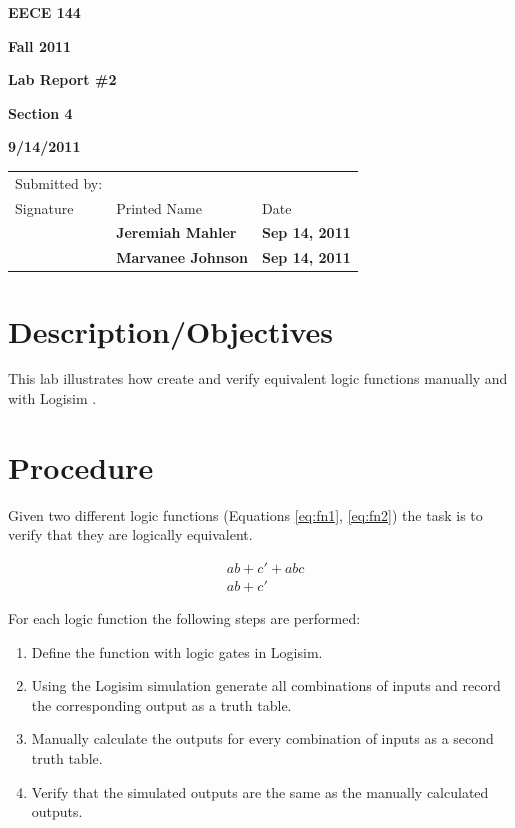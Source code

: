\documentclass[12pt]{article}
\begin{document}

\centerline{\bf EECE 144}
\centerline{\bf Fall 2011}
\centerline{\bf}
\centerline{\bf Lab Report \#2}
\centerline{\bf Section 4}
\centerline{\bf 9/14/2011}

\begin{center}
\begin{tabularx}{\textwidth}[b]{X l l}
Submitted by: & & \\
Signature & Printed Name & Date \\
\hline
\multicolumn{1}{|X|}{} & \multicolumn{1}{|l|}{\bigstrut \bf Jeremiah Mahler} & \multicolumn{1}{|l|}{\bf Sep 14, 2011} \\
\hline
\multicolumn{1}{|X|}{} & \multicolumn{1}{|l|}{\bigstrut \bf Marvanee Johnson} & \multicolumn{1}{|l|}{\bf Sep 14, 2011} \\
\hline
\end{tabularx}
\end{center}

\section{Description/Objectives}

This lab illustrates how create and verify equivalent logic functions
manually and with Logisim \cite{LOGISIM}.

\section{Procedure}

Given two different logic functions (Equations \ref{eq:fn1}, \ref{eq:fn2})
the task is to verify that they are logically equivalent.

\begin{align}
& a b + c' + abc \label{eq:fn1} \\
& a b + c' \label{eq:fn2}
\end{align}

For each logic function the following steps are performed:
\begin{enumerate}
	\item Define the function with logic gates in Logisim.
	\item Using the Logisim simulation generate all combinations of
	inputs and record the corresponding output as a truth table.
	\item Manually calculate the outputs for every combination of inputs
	as a second truth table.
	\item Verify that the simulated outputs are the same as the
	manually calculated outputs.
\end{enumerate}
\end{document}
